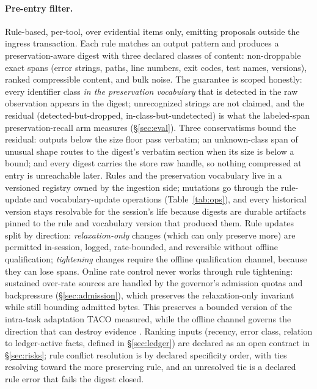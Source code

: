\documentclass[11pt]{article}
\begin{document}
\paragraph{Pre-entry filter.}
\label{sec:entryfilter}
Rule-based, per-tool, over evidential items only, emitting proposals outside the ingress transaction. Each rule matches an output pattern and produces a preservation-aware digest with three declared classes of content: non-droppable exact spans (error strings, paths, line numbers, exit codes, test names, versions), ranked compressible content, and bulk noise. The guarantee is scoped honestly: every identifier class \emph{in the preservation vocabulary} that is detected in the raw observation appears in the digest; unrecognized strings are not claimed, and the residual (detected-but-dropped, in-class-but-undetected) is what the labeled-span preservation-recall arm measures (\S\ref{sec:eval}). Three conservatisms bound the residual: outputs below the size floor pass verbatim; an unknown-class span of unusual shape routes to the digest's verbatim section when its size is below a bound; and every digest carries the store raw handle, so nothing compressed at entry is unreachable later. Rules and the preservation vocabulary live in a versioned registry owned by the ingestion side; mutations go through the rule-update and vocabulary-update operations (Table~\ref{tab:ops}), and every historical version stays resolvable for the session's life because digests are durable artifacts pinned to the rule and vocabulary version that produced them. Rule updates split by direction: \emph{relaxation-only} changes (which can only preserve more) are permitted in-session, logged, rate-bounded, and reversible without offline qualification; \emph{tightening} changes require the offline qualification channel, because they can lose spans. Online rate control never works through rule tightening: sustained over-rate sources are handled by the governor's admission quotas and backpressure (\S\ref{sec:admission}), which preserves the relaxation-only invariant while still bounding admitted bytes. This preserves a bounded version of the intra-task adaptation TACO measured, while the offline channel governs the direction that can destroy evidence \cite{taco2026}. Ranking inputs (recency, error class, relation to ledger-active facts, defined in \S\ref{sec:ledger}) are declared as an open contract in \S\ref{sec:risks}; rule conflict resolution is by declared specificity order, with ties resolving toward the more preserving rule, and an unresolved tie is a declared rule error that fails the digest closed.
\end{document}
